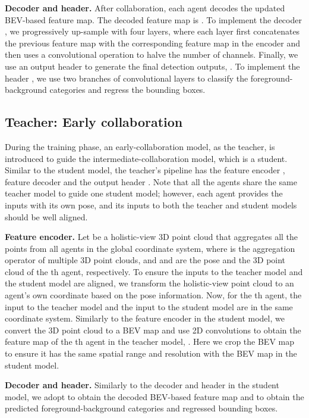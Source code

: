 \documentclass{article}
\newcommand{\mypar}[1]{{\bf #1.}}
\begin{document}
\mypar{Decoder and header}
After collaboration, each agent decodes the updated BEV-based feature map. The decoded feature map is . To implement the decoder , we progressively up-sample  with four layers, where each layer first concatenates the previous feature map with the corresponding feature map in the encoder and then uses a  convolutional operation to halve the number of channels. Finally, we use an output header to generate the final detection outputs, . To implement the header , we use two branches of convolutional layers to classify the foreground-background categories and regress the bounding boxes. 
\vspace{-3mm}
\subsection{Teacher: Early collaboration}
\vspace{-2mm} 
During the training phase, an early-collaboration model, as the teacher, is introduced to guide the intermediate-collaboration model, which is a student. Similar to the student model, the teacher's pipeline has the feature encoder , feature decoder  and the output header . Note that all the agents share the same teacher model to guide one student model; however, each agent provides the inputs with its own pose, and its inputs to both the teacher and student models should be well aligned.

\mypar{Feature encoder} 
Let  be a holistic-view 3D point cloud that aggregates all the points from all  agents in the global coordinate system, where  is the aggregation operator of multiple 3D point clouds, and  and  are the pose and the 3D point cloud of the th agent, respectively. To ensure the inputs to the teacher model and the student model are aligned,  we transform the holistic-view point cloud  to an agent's own coordinate based on the pose information. Now, for the th agent, the input to the teacher model  and the input to the student model  are in the same coordinate system. Similarly to the feature encoder in the student model, we convert the 3D point cloud  to a BEV map and use 2D convolutions to obtain the feature map of the th agent in the teacher model, . Here we crop the BEV map to ensure it has the same spatial range and resolution with the BEV map in the student model.

\mypar{Decoder and header} Similarly to the decoder and header in the student model, we adopt  to obtain the decoded BEV-based feature map and    to obtain the predicted foreground-background categories and regressed bounding boxes. 
\end{document}
